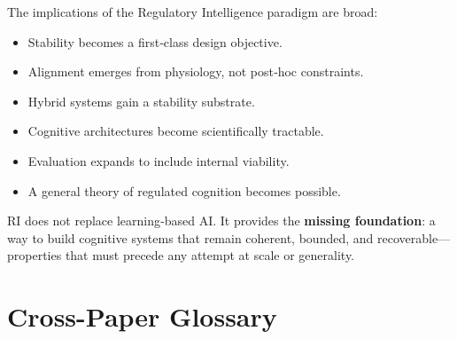 \documentclass[12pt,a4paper]{report}
\begin{document}
The implications of the Regulatory Intelligence paradigm are broad:

\begin{itemize}
    \item Stability becomes a first‑class design objective.
    \item Alignment emerges from physiology, not post‑hoc constraints.
    \item Hybrid systems gain a stability substrate.
    \item Cognitive architectures become scientifically tractable.
    \item Evaluation expands to include internal viability.
    \item A general theory of regulated cognition becomes possible.
\end{itemize}

RI does not replace learning‑based AI. It provides the \textbf{missing foundation}: a way to build cognitive systems that remain coherent, bounded, and recoverable—properties that must precede any attempt at scale or generality.

\section{Cross-Paper Glossary}
\end{document}
